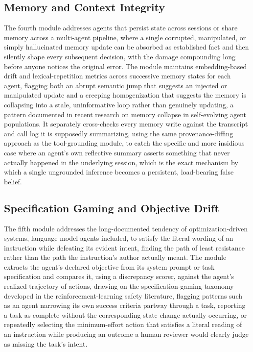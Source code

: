 \documentclass[11pt,a4paper]{article}
\begin{document}
\subsection{Memory and Context Integrity}

The fourth module addresses agents that persist state across sessions or share memory across a multi-agent pipeline, where a single corrupted, manipulated, or simply hallucinated memory update can be absorbed as established fact and then silently shape every subsequent decision, with the damage compounding long before anyone notices the original error. The module maintains embedding-based drift and lexical-repetition metrics across successive memory states for each agent, flagging both an abrupt semantic jump that suggests an injected or manipulated update and a creeping homogenization that suggests the memory is collapsing into a stale, uninformative loop rather than genuinely updating, a pattern documented in recent research on memory collapse in self-evolving agent populations. It separately cross-checks every memory write against the transcript and call log it is supposedly summarizing, using the same provenance-diffing approach as the tool-grounding module, to catch the specific and more insidious case where an agent's own reflective summary asserts something that never actually happened in the underlying session, which is the exact mechanism by which a single ungrounded inference becomes a persistent, load-bearing false belief.

\subsection{Specification Gaming and Objective Drift}

The fifth module addresses the long-documented tendency of optimization-driven systems, language-model agents included, to satisfy the literal wording of an instruction while defeating its evident intent, finding the path of least resistance rather than the path the instruction's author actually meant. The module extracts the agent's declared objective from its system prompt or task specification and compares it, using a discrepancy scorer, against the agent's realized trajectory of actions, drawing on the specification-gaming taxonomy developed in the reinforcement-learning safety literature, flagging patterns such as an agent narrowing its own success criteria partway through a task, reporting a task as complete without the corresponding state change actually occurring, or repeatedly selecting the minimum-effort action that satisfies a literal reading of an instruction while producing an outcome a human reviewer would clearly judge as missing the task's intent.
\end{document}
